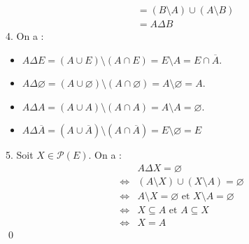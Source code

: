 \documentclass[10pt]{article}
\begin{document}
\begin{tcolorbox}[enhanced, width=7in, center, size=fbox, fontupper=\large, drop shadow southwest]
\begin{align*}
        &=(B \setminus A) \cup (A \setminus B)\\
        &=A \Delta B
    \end{align*}
    4. On a :
    \begin{itemize}
        \item $A \Delta E = (A \cup E) \setminus (A \cap E) = E \setminus A = E \cap \overline{A}$.
        \item $A \Delta \varnothing = (A \cup \varnothing) \setminus (A \cap \varnothing) = A \setminus \varnothing = A$.
        \item $A \Delta A = (A \cup A) \setminus (A \cap A) = A \setminus A = \varnothing$.
        \item $A \Delta \overline{A} = (A \cup \overline{A}) \setminus (A \cap \overline{A}) = E \setminus \varnothing = E$
    \end{itemize}
    5. Soit $X \in \mathcal{P}(E)$. On a :
    \begin{align*}
        &A \Delta X = \varnothing\\
        \iff& (A \setminus X) \cup (X \setminus A) = \varnothing\\
        \iff& A \setminus X = \varnothing \text{ et } X \setminus A = \varnothing\\
        \iff& X \subseteq A \text{ et } A \subseteq X\\
        \iff& X = A
    \end{align*}
    \qed
\end{tcolorbox}

\end{document}

